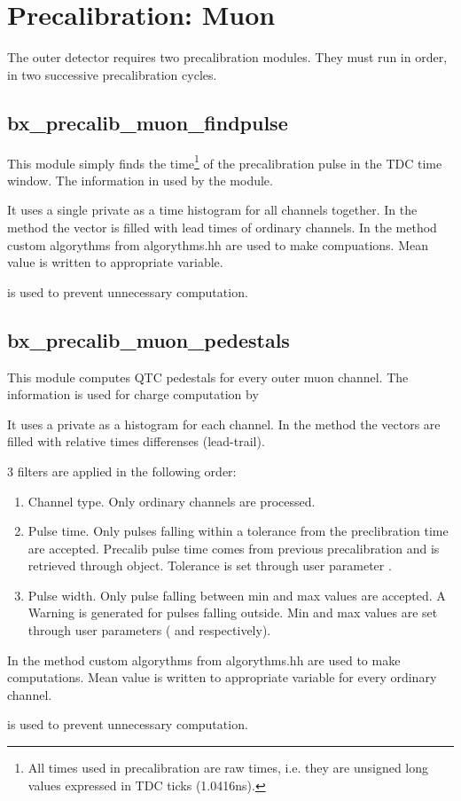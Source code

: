 \section{Precalibration: Muon}
\label{sec:precalib_muon}

The outer detector requires two precalibration modules.
They must run in order, in two successive precalibration cycles.

\subsection{bx\_precalib\_muon\_findpulse}

This module simply finds the time\footnote{All times used in precalibration are raw times, i.e. they are unsigned long values expressed in TDC ticks (1.0416ns).} 
of the precalibration pulse in the TDC time window. 
The information in used by the  module.

It uses a single private  as a time histogram for all channels together.
In the  method the vector is filled with lead times of ordinary channels.
In the  method custom algorythms from algorythms.hh are used to make compuations.
Mean value is written to appropriate  variable.

 is used to prevent unnecessary computation.

\subsection{bx\_precalib\_muon\_pedestals}

This module computes QTC pedestals for every outer muon channel.
The information is used for charge computation by 

It uses a private  as a histogram for each channel.
In the  method the vectors are filled with relative times differenses (lead-trail).

3 filters are applied in the following order:
\begin{enumerate}
\item Channel type. Only ordinary channels are processed.
\item Pulse time. Only pulses falling within a tolerance from the preclibration time are accepted.
Precalib pulse time comes from previous precalibration and is retrieved through  object.
Tolerance is set through user parameter .
\item Pulse width. Only pulse falling between min and max values are accepted. 
A Warning is generated for pulses falling outside.
Min and max values are set through user parameters ( and  respectively).
\end{enumerate}

In the  method custom algorythms from algorythms.hh are used to make computations.
Mean value is written to appropriate  variable for every ordinary channel.

 is used to prevent unnecessary computation.
